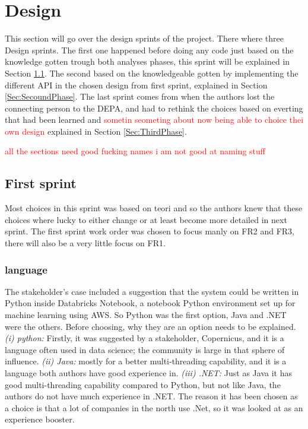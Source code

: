 \chapter{Design} \label{Design}
This section will go over the design sprints of the project. There where three Design sprints. The first one happened before doing any code just based on the knowledge gotten trough both analyses phases, this sprint will be explained in Section \ref{Sec:FirstPhase}. The second based on the knowledgeable gotten by implementing the different API in the chosen design from first sprint, explained in Section \ref{Sec:SecoundPhase}. The last sprint comes from when the authors lost the connecting person to the DEPA, and had to rethink the choices based on everting that had been learned and \textcolor{red}{sometin seometing about now being able to choice thei own design } explained in Section \ref{Sec:ThirdPhase}.

\textcolor{red}{all the sections need good fucking names i am not good at naming stuff
}


\section{First sprint}\label{Sec:FirstPhase}
Most choices in this sprint was based on teori and so the authors knew that these choices where lucky to either change or at least become more detailed in next sprint. 
The first sprint work order was chosen to focus manly on FR2 and FR3, there will also be a very little focus on FR1.

\subsection{language}
The stakeholder's case included a suggestion that the system could be written in Python inside Databricks Notebook, a notebook Python environment set up for machine learning using \acrfull{AWS}. So Python was the first option, Java and .NET were the others.
Before choosing, why they are an option needs to be explained. 
\textit{(i) python:} Firstly, it was suggested by a stakeholder, Copernicus, and it is a language often used in data science; the community is large in that sphere of influence. 
\textit{(ii) Java:} mostly for a better multi-threading capability, and it is a language both authors have good experience in. \textit{(iii) .NET:} Just as Java it has good multi-threading capability compared to Python, but not like Java, the authors do not have much experience in .NET. The reason it has been chosen as a choice is that a lot of companies in the north use .Net, so it was looked at as an experience booster.

